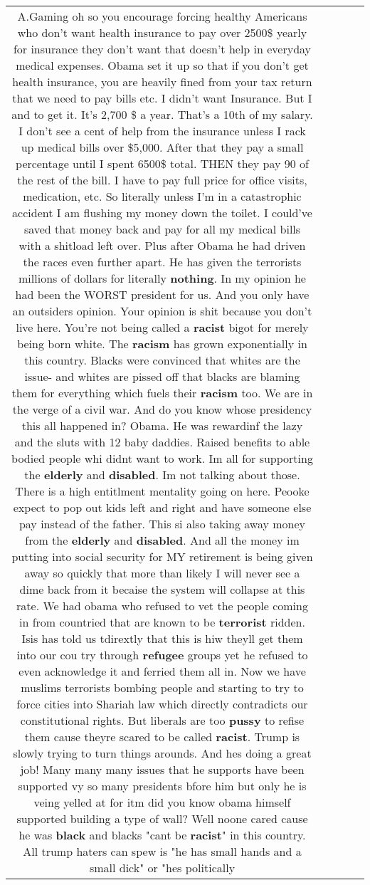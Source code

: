 \documentclass[11pt]{article}
\newlength\mylength
\begin{document}
\begin{center}
\begin{longtable}{|C{.65\mylength}|C{.30\mylength}|C{.12\mylength}|C{.12\mylength}|C{.12\mylength}|}
  \small A.Gaming oh so you encourage forcing healthy Americans who don't want health insurance to pay over 2500\$ yearly for insurance they don't want that doesn't help in everyday medical expenses. Obama set it up so that if you don't get health insurance, you are heavily fined from your tax return that we need to pay bills etc.  I didn't want Insurance. But I and to get it. It's 2,700 \$ a year. That's a 10th of my salary. I don't see a cent of help from the insurance unless I rack up medical bills over \$5,000. After that they pay a small percentage until I spent 6500\$ total. THEN they pay 90 of the rest of the bill. I have to pay full price for office visits, medication, etc. So literally unless I'm in a catastrophic accident I am flushing my money down the toilet.  I could've saved that money back and pay for all my medical bills with a shitload left over.   Plus after Obama he had driven the races even further apart. He has given the terrorists millions of dollars for literally \textbf{nothing}. In my opinion he had been the WORST president for us. And you only have an outsiders opinion. Your opinion is shit because you don't live here. You're not being called a \textbf{racist} bigot for merely being born white. The \textbf{racism} has grown exponentially in this country. Blacks were convinced that whites are the issue- and whites are pissed off that blacks are blaming them for everything which fuels their \textbf{racism} too. We are in the verge of a civil war. And do you know whose presidency this all happened in? Obama. He was rewardinf the lazy and the sluts with 12 baby daddies. Raised benefits to able bodied people whi didnt want to work. Im all for supporting the \textbf{elderly} and \textbf{disabled}. Im not talking about those. There is a high entitlment mentality going on here. Peooke expect to pop out kids left and right and have someone else pay instead of the father. This si also taking away money from the \textbf{elderly} and \textbf{disabled}. And all the money im putting into social security for MY retirement is being given away so quickly that more than likely I will never see a dime back from it becaise the system will collapse at this rate. We had obama who refused to vet the people coming in from countried that are known to be \textbf{terrorist} ridden. Isis has told us tdirextly that this is hiw theyll get them into our cou try through \textbf{refugee} groups yet he refused to even acknowledge it and ferried them all in. Now we have muslims terrorists bombing people and starting to try to force cities into Shariah law which directly contradicts our constitutional rights. But liberals are too \textbf{pussy} to refise them cause theyre scared to be called \textbf{racist}. Trump is slowly trying to turn things arounds. And hes doing a great job! Many many many issues that he supports have been supported vy so many presidents bfore him but only he is veing yelled at for itm did you know obama himself supported building a type of wall? Well noone cared cause he was \textbf{black} and blacks "cant be \textbf{racist}" in this country. All trump haters can spew is "he has small hands and a small dick" or "hes politically 
\end{longtable}
\end{center}
\end{document}

